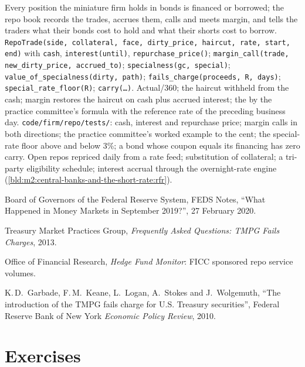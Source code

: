 \begin{build}
 Every position the miniature firm holds in bonds is
financed or borrowed; the repo book records the trades, accrues them, calls
and meets margin, and tells the traders what their bonds cost to hold and what
their shorts cost to borrow.
 \texttt{RepoTrade(side, collateral, face, dirty\_price,
haircut, rate, start, end)} with \texttt{cash}, \texttt{interest(until)},
\texttt{repurchase\_price()}; \texttt{margin\_call(trade, new\_dirty\_price,
accrued\_to)}; \texttt{specialness(gc, special)};
\texttt{value\_of\_specialness(dirty, path)}; \texttt{fails\_charge(proceeds,
R, days)}; \texttt{special\_rate\_floor(R)}; \texttt{carry(\ldots)}.
 Actual/360; the haircut withheld from the cash; margin restores
the haircut on cash plus accrued interest; the  by the practice
committee's formula with the reference rate of the preceding business day.
 \texttt{code/firm/repo/tests/}: cash, interest and
repurchase price; margin calls in both directions; the practice committee's
worked example to the cent; the special-rate floor above and below 3\%; a bond
whose coupon equals its financing has zero carry.
 Open repos repriced daily from a rate feed; substitution of
collateral; a tri-party eligibility schedule; interest accrual through the
overnight-rate engine (\cref{bld:m2:central-banks-and-the-short-rate:rfr}).
\end{build}

\begin{omsources}
\item Board of Governors of the Federal Reserve System, FEDS Notes, ``What
Happened in Money Markets in September 2019?'', 27 February 2020.
\item Treasury Market Practices Group, \emph{Frequently Asked Questions: TMPG
Fails Charges}, 2013.
\item Office of Financial Research, \emph{Hedge Fund Monitor}: FICC sponsored
repo service volumes.
\item K.\,D.\ Garbade, F.\,M.\ Keane, L.\ Logan, A.\ Stokes and J.\ Wolgemuth,
``The introduction of the TMPG fails charge for U.S. Treasury securities'',
Federal Reserve Bank of New York \emph{Economic Policy Review}, 2010.
\end{omsources}

\section{Exercises}

